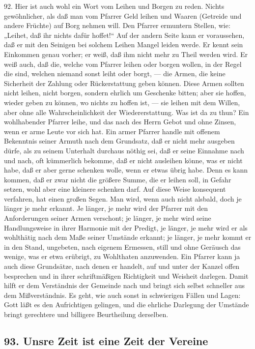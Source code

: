 92. Hier ist auch wohl ein Wort vom Leihen und Borgen zu reden. Nichts gewöhnlicher, als daß man vom Pfarrer Geld leihen und Waaren (Getreide und andere Früchte) auf Borg nehmen will. Den Pfarrer ermuntern Stellen, wie: „Leihet, daß ihr nichts dafür hoffet!“ Auf der andern Seite kann er voraussehen, daß er mit den Seinigen bei solchem Leihen Mangel leiden werde. Er kennt sein Einkommen genau vorher; er weiß, daß ihm
nicht mehr zu Theil werden wird. Er weiß auch, daß die, welche vom Pfarrer leihen oder borgen wollen, in der Regel die sind, welchen niemand sonst leiht oder borgt, — die Armen, die keine Sicherheit der Zahlung oder Rückerstattung geben können. Diese Armen sollten nicht leihen, nicht borgen, sondern ehrlich um Geschenke bitten; aber sie hoffen, wieder geben zu können, wo nichts zu hoffen ist, — sie leihen mit dem Willen, aber ohne alle Wahrscheinlichkeit der Wiedererstattung. Was ist da zu thun? Ein wohlhabender Pfarrer leihe, und das nach des Herrn Gebot und ohne Zinsen, wenn er arme Leute vor sich hat. Ein armer Pfarrer handle mit offenem Bekenntnis seiner Armuth nach dem Grundsatz, daß er nicht mehr ausgeben dürfe, als zu seinem Unterhalt durchaus nöthig sei, daß er seine Einnahme nach und nach, oft kümmerlich bekomme, daß er nicht ausleihen könne, was er nicht habe, daß er aber gerne schenken wolle, wenn er etwas übrig habe. Denn es kann kommen, daß er zwar nicht die größere Summe, die er leihen soll, in Gefahr setzen, wohl aber eine kleinere schenken darf. Auf diese Weise konsequent verfahren, hat einen großen Segen. Man wird, wenn auch nicht alsbald, doch je länger je mehr erkannt. Je länger, je mehr wird der Pfarrer mit den Anforderungen seiner Armen verschont; je länger, je mehr wird seine Handlungsweise in ihrer Harmonie mit der Predigt, je länger, je mehr wird er als wohlthätig nach dem Maße seiner Umstände erkannt; je länger, je mehr kommt er in den Stand, ungebeten, nach eigenem Ermessen, still und ohne Geräusch das wenige, was er etwa erübrigt, zu
Wohlthaten anzuwenden. Ein Pfarrer kann ja auch diese Grundsätze, nach denen er handelt, auf und unter der Kanzel offen besprechen und in ihrer schriftmäßigen Richtigkeit und Weisheit darlegen. Damit hilft er dem Verständnis der Gemeinde nach und bringt sich selbst schneller aus dem Mißverständnis. Es geht, wie auch sonst in schwierigen Fällen und Lagen: Gott läßt es den Aufrichtigen gelingen, und die ehrliche Darlegung der Umstände bringt gerechtere und billigere Beurtheilung derselben.

\subsection[93. Unsre Zeit ist eine Zeit der Vereine]{93. Unsre Zeit ist eine Zeit der Vereine\protect\footnotemark}

